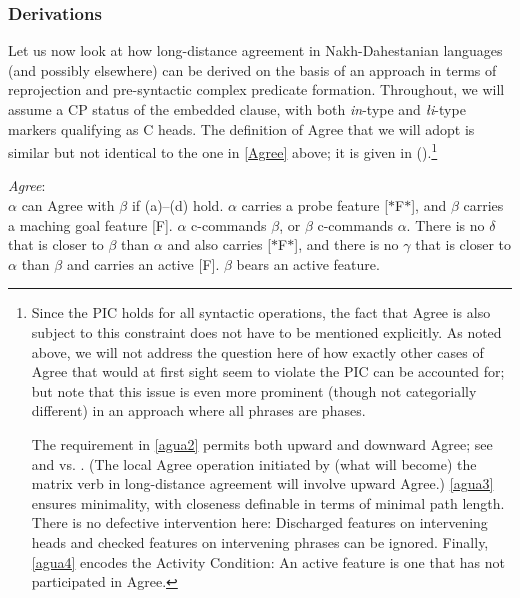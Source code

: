 \documentclass[output=paper
,modfonts
,nonflat]{langsci/langscibook}
\begin{document}
\subsubsection{Derivations}

Let us now look at how long-distance agreement in Nakh-Dahestanian
languages (and possibly elsewhere) can be derived on the basis of an
approach in terms of reprojection and pre-syntactic complex predicate
formation. Throughout, we will assume a CP status of the embedded
clause, with both  {\itshape \textcrlambda in}-type and {\itshape {\l}i}-type
markers qualifying as C heads. The definition of Agree that we will
adopt is similar but not identical to the one in \ref{Agree} above; it
is given in (\Next).\footnote{Since the PIC holds for all syntactic
  operations, the fact that Agree is also subject to this constraint
  does not have to be mentioned explicitly. As noted above, we will
  not address the question here of how exactly other cases of Agree that
  would at first sight seem to violate the PIC can be accounted for;
  but note that this issue is even more prominent (though not
  categorially different) in an approach where all phrases are
  phases. 

The requirement in \ref{agua2} permits both upward and downward Agree; see
\cite{Zeijlstra:12} and \cite{Bjorkman&Zeijlstra:14} vs. \cite{Preminger:13:tha}.
(The local Agree operation initiated by (what will become) the matrix verb in
long-distance agreement will involve upward Agree.) \ref{agua3}
ensures minimality, with closeness definable in terms of minimal path
length. There is no defective intervention here: Discharged
features on intervening  heads and checked features on intervening phrases can be ignored. Finally,
\ref{agua4} encodes the Activity Condition: An active feature is one
that has not participated in Agree.}

\ea\label{ex:mueller:29} {\itshape Agree}:\\
$\alpha$ can Agree with $\beta$ if (a)--(d) hold.
\ea $\alpha$ carries a probe feature [$*$F$*$], and $\beta$ carries a
maching goal feature [F].
\ex $\alpha$ \label{agua2}c-commands $\beta$, or $\beta$ c-commands $\alpha$.
\ex There is \label{agua3}no $\delta$ that is closer to $\beta$ than $\alpha$ and
also carries [$*$F$*$], and there is no $\gamma$ that is closer to
$\alpha$ than $\beta$ and carries an active [F].
\ex $\beta$ bears an \label{agua4}active feature. 
\z
\z
\end{document}
